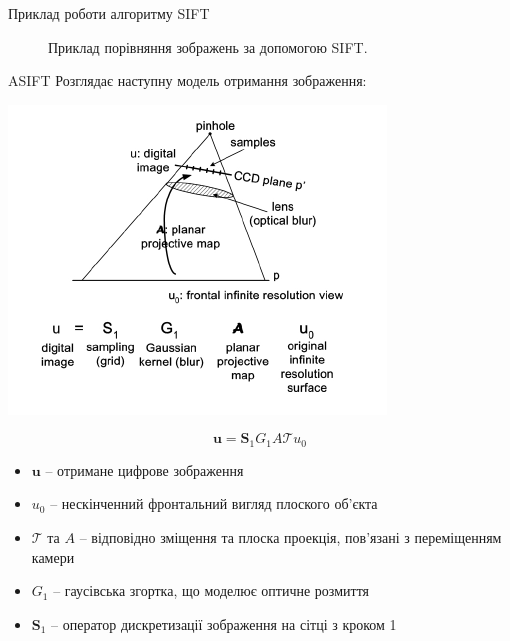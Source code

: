 \documentclass{beamer}
\begin{document}
\begin{frame}{Приклад роботи алгоритму SIFT}
\begin{figure}[h]
\begin{minipage}[h]{0.49\linewidth}
{      }
    \end{minipage}
    \label{fig:sift-sample}
    \caption{Приклад порівняння зображень за допомогою SIFT.}
  \end{figure}
\end{frame}

\begin{frame}{ASIFT}
  Розглядає наступну модель отримання зображення:

  \begin{center}\includegraphics[width=0.3\linewidth]{camera-model}\end{center}

  \begin{equation}
    \textbf{u}=\textbf{S}_1G_1A\mathcal{T}u_0
  \end{equation}

  \begin{itemize}
    \item $\textbf{u}$ -- отримане цифрове зображення
    \item $u_0$ -- нескінченний фронтальний вигляд плоского об'єкта
    \item $\mathcal{T}$ та $A$ -- відповідно зміщення та плоска проекція, пов'язані з переміщенням камери
    \item $G_1$ -- гаусівська згортка, що моделює оптичне розмиття
    \item $\textbf{S}_1$ -- оператор дискретизації зображення на сітці з кроком 1
  \end{itemize}
\end{frame}
\end{document}
